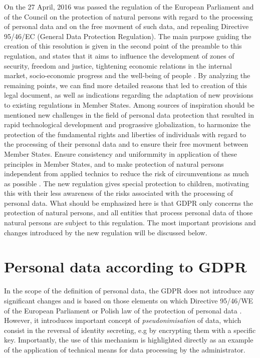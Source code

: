 \documentclass[en, noamssymb]{mgr}
\begin{document}
On the 27 April, 2016 was passed the regulation of the European Parliament and of the Council on the protection of natural persons with regard to the processing of personal data and on the free movment of such data, and repealing Directive 95/46/EC (General Data Protection Regulation). The main purpose guiding the creation of this resolution is given in the second point of the preamble to this regulation, and states that it aims to influence the development of zones of security, freedom and justice, tightening economic relations in the internal market, socio-economic progress and the well-being of people \cite{rodo_preambula}. By analyzing the remaining points, we can find more detailed reasons that led to creation of this legal document, as well as indications regarding the adaptation of new provisions to existing regulations in Member States. Among sources of inspiration should be mentioned new challenges in the field of personal data protection that resulted in rapid technological development and prograssive globalization, to harmonize the protection of the fundamental rights and liberties of individuals with regard to the processing of their personal data and to ensure their free movment between Member States. Ensure consistency and uniformmity in application of these principles in Member States, and to make protection of natural persons independent from applied technics to reduce the risk of circumventions as much as possible \cite{rodo_preambula}. The new regulation gives special protection to children, motivating this with their less awareness of the risks associated with the processing of personal data. What should be emphasized here is that GDPR only concerns the protection of natural persons, and all entities that process personal data of those natural persons are subject to this regulation. The most important provisions and changes introduced by the new regulation will be discussed below.

\section{Personal data according to GDPR}

In the scope of the definition of personal data, the GDPR does not introduce any significant changes and is based on those elements on which Directive 95/46/WE of the European Parliament \cite{95/46/we} or Polish law of the protection of personal data \cite{uodo}. However, it introduces important concept of \textit{pseudonimisation} of data, which consist in the reversal of identity secreting, e.g by encrypting them with a specific key. Importantly, the use of this mechanism is highlighted directly as an example of the application of technical means for data processing by the administrator.
\end{document}
